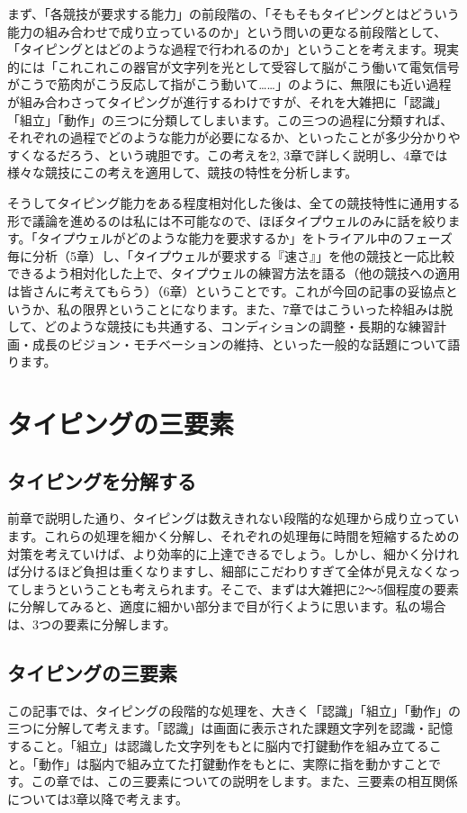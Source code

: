 まず、「各競技が要求する能力」の前段階の、「そもそもタイピングとはどういう能力の組み合わせで成り立っているのか」という問いの更なる前段階として、「タイピングとはどのような過程で行われるのか」ということを考えます。現実的には「これこれこの器官が文字列を光として受容して脳がこう働いて電気信号がこうで筋肉がこう反応して指がこう動いて……」のように、無限にも近い過程が組み合わさってタイピングが進行するわけですが、それを大雑把に「認識」「組立」「動作」の三つに分類してしまいます。この三つの過程に分類すれば、それぞれの過程でどのような能力が必要になるか、といったことが多少分かりやすくなるだろう、という魂胆です。この考えを2, 3章で詳しく説明し、4章では様々な競技にこの考えを適用して、競技の特性を分析します。

そうしてタイピング能力をある程度相対化した後は、全ての競技特性に通用する形で議論を進めるのは私には不可能なので、ほぼタイプウェルのみに話を絞ります。「タイプウェルがどのような能力を要求するか」をトライアル中のフェーズ毎に分析（5章）し、「タイプウェルが要求する『速さ』」を他の競技と一応比較できるよう相対化した上で、タイプウェルの練習方法を語る（他の競技への適用は皆さんに考えてもらう）（6章）ということです。これが今回の記事の妥協点というか、私の限界ということになります。また、7章ではこういった枠組みは脱して、どのような競技にも共通する、コンディションの調整・長期的な練習計画・成長のビジョン・モチベーションの維持、といった一般的な話題について語ります。

\section{タイピングの三要素}

\subsection{タイピングを分解する}

前章で説明した通り、タイピングは数えきれない段階的な処理から成り立っています。これらの処理を細かく分解し、それぞれの処理毎に時間を短縮するための対策を考えていけば、より効率的に上達できるでしょう。しかし、細かく分ければ分けるほど負担は重くなりますし、細部にこだわりすぎて全体が見えなくなってしまうということも考えられます。そこで、まずは大雑把に2～5個程度の要素に分解してみると、適度に細かい部分まで目が行くように思います。私の場合は、3つの要素に分解します。
\subsection{タイピングの三要素}

この記事では、タイピングの段階的な処理を、大きく「認識」「組立」「動作」の三つに分解して考えます。「認識」は画面に表示された課題文字列を認識・記憶すること。「組立」は認識した文字列をもとに脳内で打鍵動作を組み立てること。「動作」は脳内で組み立てた打鍵動作をもとに、実際に指を動かすことです。この章では、この三要素についての説明をします。また、三要素の相互関係については3章以降で考えます。

